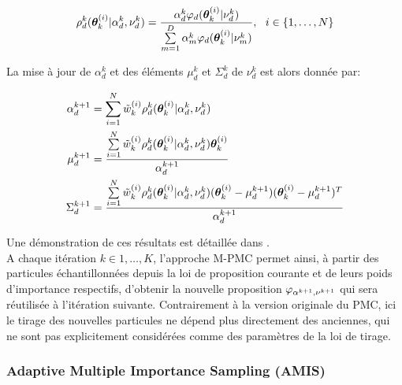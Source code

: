 \begin{equation}
	\rho_d^k({\bm{\theta}}_k^{(i)} | \alpha_d^k , \nu_d^k) = \dfrac{\alpha_d^k \varphi_d({\bm{\theta}}_k^{(i)} | \nu_d^k)}{\sum\limits_{m=1}^D\alpha_m^k \varphi_d({\bm{\theta}}_k^{(i)} | \nu_m^k)}, ~~ i \in \{1, \dots, N\}
\end{equation}

La mise à jour de $\alpha_d^k$ et des éléments $\mu_d^k$ et $\Sigma_d^k$ de $\nu_d^k$ est alors donnée par:

\begin{equation}
\begin{split}
\alpha_d^{k+1}  &= \sum\limits_{i=1}^N \tilde{w}_k^{(i)} \rho_d^k({\bm{\theta}}_k^{(i)} | \alpha_d^k , \nu_d^k) \\
\mu_d^{k+1} &= \dfrac{\sum\limits_{i=1}^N\tilde{w}_k^{(i)} \rho_d^k({\bm{\theta}}_k^{(i)} | \alpha_d^k , \nu_d^k) {\bm{\theta}}_k^{(i)}}{\alpha_d^{k+1} } \\
\Sigma_d^{k+1} &= \dfrac{\sum\limits_{i=1}^N \tilde{w}_k^{(i)} \rho_d^k({\bm{\theta}}_k^{(i)} | \alpha_d^k , \nu_d^k)({\bm{\theta}}_k^{(i)} - \mu_d^{k+1})({\bm{\theta}}_k^{(i)} - \mu_d^{k+1})^T }{\alpha_d^{k+1}}
\end{split}
\label{eq_maj_gaussien}
\end{equation}


Une démonstration de ces résultats est détaillée dans {\cite{Douc2007}.} \\


A chaque itération $k \in {1, \dots, K}$, l'approche M-PMC permet ainsi, à partir des particules échantillonnées depuis la loi de proposition courante et de leurs poids d'importance respectifs, d'obtenir la nouvelle proposition ${\varphi}_{\alpha^{k+1}, \nu^{k+1}}$ qui sera réutilisée à l'itération suivante. Contrairement à la version originale du PMC, ici le tirage des nouvelles particules ne dépend plus directement des anciennes, qui ne sont pas explicitement considérées comme des paramètres de la loi de tirage. \\

\subsubsection{Adaptive Multiple Importance Sampling (AMIS)}


